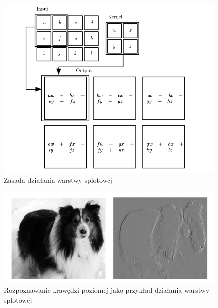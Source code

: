 \documentclass{classrep}
\begin{document}
{        \begin{figure}[!htbp]
        \centering
        \includegraphics[width=\textwidth]{img/conv.png}
        \caption{Zasada działania warstwy splotowej \cite{url:conv}}
        \label{fig:conv}
        \end{figure}

        \begin{figure}[!htbp]
        \centering
        \includegraphics[width=\textwidth]{img/conv_example.png}
        \caption{Rozpoznawanie krawędzi poziomej jako przykład działania warstwy splotowej \cite{url:conv_example}}
        \label{fig:conv_example}
        \end{figure}
        \FloatBarrier

}
\end{document}
